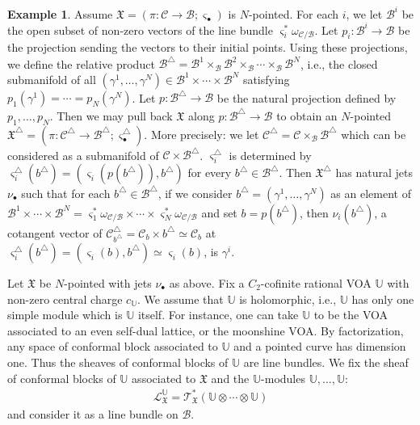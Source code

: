 \documentclass[12pt,b5paper,notitlepage]{report}
\theoremstyle{definition}
\newtheorem{eg}[df]{Example}
\theoremstyle{plain}
\newcommand{\fk}{\mathfrak}
\newcommand{\mc}{\mathcal}
\newcommand{\scr}{\mathscr}
\newcommand{\sgm}{\varsigma}
\newcommand{\blt}{\bullet}
\newcommand{\Ubb}{\mathbb U}
\numberwithin{equation}{section}
\begin{document}
\begin{eg}
Assume $\fk X=(\pi:\mc C\rightarrow\mc B;\sgm_\blt)$ is $N$-pointed. For each $i$, we let $\mc B^i$ be the open subset of non-zero vectors of the line bundle $\sgm_i^*\omega_{\mc C/\mc B}$.  Let $p_i:\mc B^i\rightarrow\mc B$ be the projection sending the vectors to their initial points. Using these projections, we define the relative product $\mc B^\triangle=\mc B^1\times_{\mc B}\mc B^2\times_{\mc B}\cdots \times_{\mc B}\mc B^N$, i.e., the closed submanifold of all $(\gamma^1,\dots,\gamma^N)\in \mc B^1\times\cdots\times \mc B^N$ satisfying $p_1(\gamma^1)=\cdots= p_N(\gamma^N)$. Let $p:\mc B^\triangle\rightarrow\mc B$ be the natural projection defined by $p_1,\dots,p_N$. Then we may pull back $\fk X$ along $p:\mc B^\triangle\rightarrow\mc B$ to obtain an $N$-pointed $\fk X^\triangle=(\pi:\mc C^\triangle\rightarrow\mc B^\triangle;\sgm_\blt^\triangle)$. More precisely: we let $\mc C^\triangle=\mc C\times_{\mc B}\mc B^\triangle$ which can be considered as a submanifold of $\mc C\times\mc B^\triangle$. $\sgm_i^\triangle$ is determined by $\sgm_i^\triangle(b^\triangle)=(\sgm_i(p(b^\triangle)),b^\triangle)$ for every $b^\triangle\in\mc B^\triangle$. Then $\fk X^\triangle$ has natural jets $\nu_\blt$ such that for each $b^\triangle\in\mc B^\triangle$, if we consider $b^\triangle=(\gamma^1,\dots,\gamma^N)$  as an element of $\mc B^1\times\cdots\times\mc B^N=\sgm_1^*\omega_{\mc C/\mc B}\times\cdots\times\sgm_N^*\omega_{\mc C/\mc B}$ and set $b=p(b^\triangle)$, then $\nu_i(b^\triangle)$, a cotangent vector of $\mc C^\triangle_{b^\triangle}=\mc C_b\times b^\triangle\simeq \mc C_b$ at $\sgm_i^\triangle(b^\triangle)=(\sgm_i(b),b^\triangle)\simeq \sgm_i(b)$, is $\gamma^i$.
\end{eg}




Let $\fk X$ be $N$-pointed with jets $\nu_\blt$ as above. Fix a $C_2$-cofinite rational VOA $\Ubb$ with non-zero central charge $c_\Ubb$. We assume that $\Ubb$ is holomorphic, i.e., $\Ubb$ has only one simple module which is $\Ubb$ itself. For instance, one can take $\Ubb$ to be the VOA associated to an even self-dual lattice, or the moonshine VOA. By factorization, any space of conformal block associated to $\Ubb$ and a pointed curve has dimension one. Thus the sheaves of conformal blocks of $\Ubb$ are line bundles. We fix the sheaf of conformal blocks of $\Ubb$ associated to $\fk X$ and the $\Ubb$-modules \index{LXU@$\scr L_{\fk X}^\Ubb$} $\Ubb,\dots,\Ubb$:
\begin{align*}
\scr L_{\fk X}^\Ubb=\scr T_{\fk X}^*(\Ubb\otimes\cdots\otimes\Ubb)
\end{align*}
and consider it as a line bundle on $\mc B$.
\end{document}
